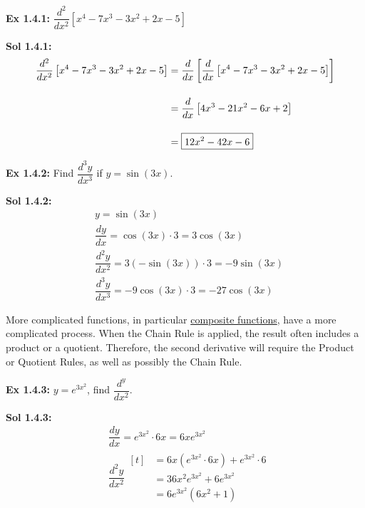 \begin{tcolorbox}[example]
    \textbf{Ex 1.4.1: } $\dfrac{d^2}{dx^2} \left[x^4 - 7x^3 - 3x^2 + 2x - 5\right]$
\end{tcolorbox}
\begin{tcolorbox}[solution]
    \textbf{Sol 1.4.1: } \begin{align*}
        \dfrac{d^2}{dx^2} \left[x^4 - 7x^3 - 3x^2 + 2x - 5\right] &= \dfrac{d}{dx} \left[\dfrac{d}{dx} \left[x^4 - 7x^3 - 3x^2 + 2x - 5\right]\right] \\[11pt]
        & = \dfrac{d}{dx} \left[4x^3 - 21x^2 - 6x + 2\right] \\[11pt]
        & = \boxed{12x^2 - 42x - 6}
    \end{align*}
\end{tcolorbox} \vspace{11pt}
 
\begin{tcolorbox}[example]
    \textbf{Ex 1.4.2: } Find $\dfrac{d^3y}{dx^3}$ if $y = \sin (3x)$.
\end{tcolorbox} 
\begin{tcolorbox}[solution]
    \textbf{Sol 1.4.2: } \begin{align*}
        & y = \sin (3x) \\[11pt]
        & \dfrac{dy}{dx} = \cos (3x) \cdot 3 = 3\cos (3x) \\[11pt]
        & \dfrac{d^2y}{dx^2} = 3(-\sin (3x)) \cdot 3 = -9\sin (3x) \\[11pt]
        & \dfrac{d^3y}{dx^3} = -9\cos (3x) \cdot 3 = \boxed{-27\cos (3x)}
    \end{align*}
\end{tcolorbox}

More complicated functions, in particular \hyperlink{Composite Function}{composite functions}, have a more complicated process. When the Chain Rule is applied, the result often includes a product or a quotient. Therefore, the second derivative will require the Product or Quotient Rules, as well as possibly the Chain Rule. \par

\begin{tcolorbox}[example]
    \textbf{Ex 1.4.3: } $y = e^{3x^2}$, find $\dfrac{d^y}{dx^2}$. 
\end{tcolorbox}
\begin{tcolorbox}[solution]
    \textbf{Sol 1.4.3: }\begin{align*}
        & \dfrac{dy}{dx} = e^{3x^2} \cdot 6x = 6xe^{3x^2} \\[11pt]
        & \dfrac{d^2y}{dx^2} \begin{aligned}[t]
            & = 6x\left(e^{3x^2} \cdot 6x\right) + e^{3x^2} \cdot 6 \\[11pt]
            & = 36x^2e^{3x^2} + 6e^{3x^2} \\[11pt]
            & = \boxed{6e^{3x^2}\left(6x^2 + 1\right)}
        \end{aligned}
    \end{align*}
\end{tcolorbox} \vspace{11pt}

